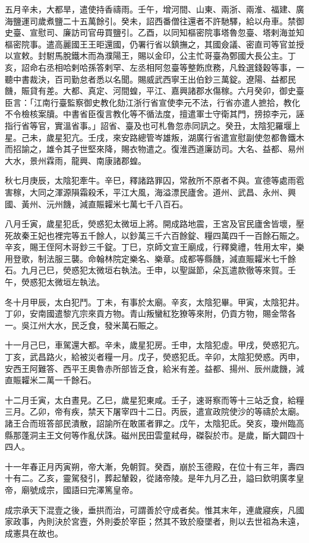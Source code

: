 \begin{pinyinscope}
 五月辛未，大都旱，遣使持香禱雨。壬午，增河間、山東、兩浙、兩淮、福建、廣海鹽運司歲煮鹽二十五萬餘引。癸未，詔西番僧往還者不許馳驛，給以舟車。禁御史臺、宣慰司、廉訪司官毋買鹽引。乙酉，以同知樞密院事塔魯忽臺、塔剌海並知樞密院事。遣高麗國王王昛還國，仍署行省以鎮撫之，其國僉議、密直司等官並授以宣敕。封駙馬脫鐵木而為濮陽王，賜以金印，公主忙哥臺為鄄國大長公主。丁亥，詔命右丞相哈剌哈孫答剌罕、左丞相阿忽臺等整飭庶務，凡銓選錢穀等事，一聽中書裁決，百司勤怠者悉以名聞。賜威武西寧王出伯鈔三萬錠。遼陽、益都民饑，賑貸有差。大都、真定、河間蝗，平江、嘉興諸郡水傷稼。六月癸卯，御史臺臣言：「江南行臺監察御史教化劾江浙行省宣使李元不法，行省亦遣人摭拾，教化不令檢核案牘。中書省臣復言教化等不循法度，擅遣軍士守衛其門，搒掠李元，誣指行省等官，實溫省事。」詔省、臺及也可札魯忽赤同訊之。癸丑，太陰犯羅堰上星。己未，歲星犯亢。壬戌，來安路總管岑雄叛，湖廣行省遣宣慰副使忽都魯鐵木而招諭之，雄令其子世堅來降，賜衣物遣之。復淮西道廉訪司。大名、益都、易州大水，景州霖雨，龍興、南康諸郡蝗。



 秋七月庚辰，太陰犯牽牛。辛巳，釋諸路罪囚，常赦所不原者不與。宣德等處雨雹害稼，大同之渾源隕霜殺禾，平江大風，海溢漂民廬舍。道州、武昌、永州、興國、黃州、沅州饑，減直賑糶米七萬七千八百石。



 八月壬寅，歲星犯氐，熒惑犯太微垣上將。開成路地震，王宮及官民廬舍皆壞，壓死故秦王妃也裡完等五千餘人，以鈔萬三千六百餘錠、糧四萬四千一百餘石賑之。辛亥，賜王侄阿木哥鈔三千錠。丁巳，京師文宣王廟成，行釋奠禮，牲用太牢，樂用登歌，制法服三襲。命翰林院定樂名、樂章。成都等縣饑，減直賑糶米七千餘石。九月己巳，熒惑犯太微垣右執法。壬申，以聖誕節，朵瓦遣款徹等來賀。壬午，熒惑犯太微垣左執法。



 冬十月甲辰，太白犯鬥。丁未，有事於太廟。辛亥，太陰犯畢。甲寅，太陰犯井。丁卯，安南國遣黎亢宗來貢方物。青山叛蠻紅犵獠等來附，仍貢方物，賜金幣各一。吳江州大水，民乏食，發米萬石賑之。



 十一月己巳，車駕還大都。辛未，歲星犯房。壬申，太陰犯虛。甲戌，熒惑犯亢。丁亥，武昌路火，給被災者糧一月。戊子，熒惑犯氐。辛卯，太陰犯熒惑。丙申，安西王阿難答、西平王奧魯赤所部皆乏食，給米有差。益都、揚州、辰州歲饑，減直賑糶米二萬一千餘石。



 十二月壬寅，太白晝見。乙巳，歲星犯東咸。壬子，速哥察而等十三站乏食，給糧三月。乙卯，帝有疾，禁天下屠宰四十二日。丙辰，遣宣政院使沙的等禱於太廟。諸王合而班答部民潰散，詔諭所在敢匿者罪之。戊午，太陰犯氐。癸亥，瓊州臨高縣那蓬洞主王文何等作亂伏誅。磁州民田雲童弒母，磔裂於市。是歲，斷大闢四十四人。



 十一年春正月丙寅朔，帝大漸，免朝賀。癸酉，崩於玉德殿，在位十有三年，壽四十有二。乙亥，靈駕發引，葬起輦穀，從諸帝陵。是年九月乙丑，謚曰欽明廣孝皇帝，廟號成宗，國語曰完澤篤皇帝。



 成宗承天下混壹之後，垂拱而治，可謂善於守成者矣。惟其末年，連歲寢疾，凡國家政事，內則決於宮壼，外則委於宰臣；然其不致於廢墜者，則以去世祖為未遠，成憲具在故也。



\end{pinyinscope}